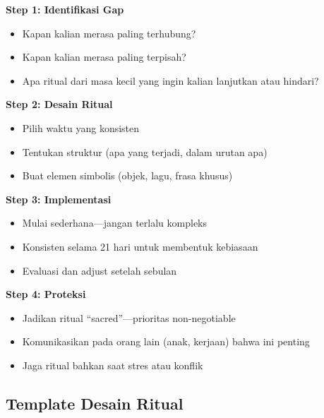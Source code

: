 \begin{tipbox}
\textbf{Step 1: Identifikasi Gap}
\begin{itemize}
    \item Kapan kalian merasa paling terhubung?
    \item Kapan kalian merasa paling terpisah?
    \item Apa ritual dari masa kecil yang ingin kalian lanjutkan atau hindari?
\end{itemize}

\textbf{Step 2: Desain Ritual}
\begin{itemize}
    \item Pilih waktu yang konsisten
    \item Tentukan struktur (apa yang terjadi, dalam urutan apa)
    \item Buat elemen simbolis (objek, lagu, frasa khusus)
\end{itemize}

\textbf{Step 3: Implementasi}
\begin{itemize}
    \item Mulai sederhana---jangan terlalu kompleks
    \item Konsisten selama 21 hari untuk membentuk kebiasaan
    \item Evaluasi dan adjust setelah sebulan
\end{itemize}

\textbf{Step 4: Proteksi}
\begin{itemize}
    \item Jadikan ritual ``sacred''---prioritas non-negotiable
    \item Komunikasikan pada orang lain (anak, kerjaan) bahwa ini penting
    \item Jaga ritual bahkan saat stres atau konflik
\end{itemize}
\end{tipbox}

\subsection{Template Desain Ritual}

